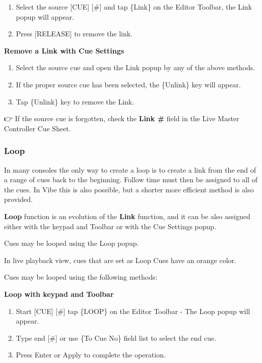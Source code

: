 \documentclass[
]{article}
\begin{document}
\begin{enumerate}
\def\labelenumi{\arabic{enumi}.}
\item
  Select the source {[}CUE{]} {[}\#{]} and tap \{Link\} on the Editor Toolbar, the Link popup will appear.
\item
  Press {[}RELEASE{]} to remove the link.
\end{enumerate}

\textbf{Remove a Link with Cue Settings}

\begin{enumerate}
\def\labelenumi{\arabic{enumi}.}
\item
  Select the source cue and open the Link popup by any of the above methods.
\item
  If the proper source cue has been selected, the \{Unlink\} key will appear.
\item
  Tap \{Unlink\} key to remove the Link.
\end{enumerate}

👉 If the source cue is forgotten, check the \textbf{Link \#} field in the Live Master Controller Cue Sheet.

\hypertarget{loop}{%
\subsubsection{Loop}\label{loop}}

In many consoles the only way to create a loop is to create a link from the end of a range of cues back to the beginning. Follow time must then be assigned to all of the cues. In Vibe this is also possible, but a shorter more efficient method is also provided.

\textbf{Loop} function is an evolution of the \textbf{Link} function, and it can be also assigned either with the keypad and Toolbar or with the Cue Settings popup.

Cues may be looped using the Loop popup.

In live playback view, cues that are set as Loop Cues have an orange color.

Cues may be looped using the following methods:

\textbf{Loop with keypad and Toolbar}

\begin{enumerate}
\def\labelenumi{\arabic{enumi}.}
\item
  Start {[}CUE{]} {[}\#{]} tap \{LOOP\} on the Editor Toolbar - The Loop popup will appear.
\item
  Type end {[}\#{]} or use \{To Cue No\} field list to select the end cue.
\item
  Press Enter or Apply to complete the operation.
\end{enumerate}
\end{document}
